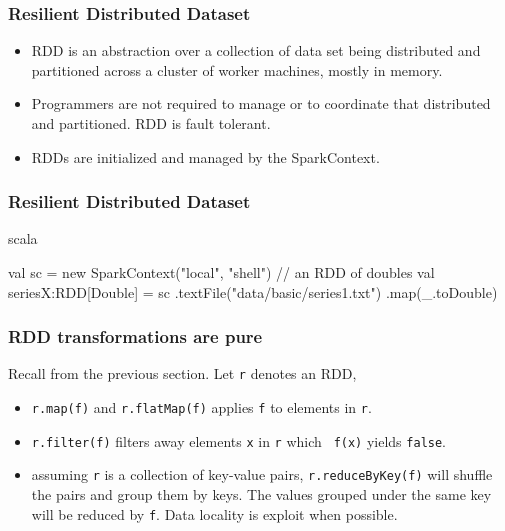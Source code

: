 \documentclass{beamer}
\newcommand{\beb}{\begin{exampleblock}}
\newcommand{\eeb}{\end{exampleblock}}
\begin{document}
\begin{frame}[fragile]
\frametitle{Resilient Distributed Dataset}

\begin{itemize} 
\item RDD is an abstraction over a collection of data set being distributed
and partitioned across a cluster of worker machines, mostly in memory.
\item Programmers are not required to manage or to coordinate that
distributed and partitioned. RDD is fault tolerant.  
\item RDDs are initialized and managed by the SparkContext.
\end{itemize}
\end{frame}


\begin{frame}[fragile]
\frametitle{Resilient Distributed Dataset}

\beb{scala}
\begin{code}
val sc = new SparkContext("local", "shell")	
// an RDD of doubles 
val seriesX:RDD[Double] = sc
  .textFile("data/basic/series1.txt")
  .map(_.toDouble)
\end{code}
\eeb
\end{frame}



\begin{frame}[fragile]
\frametitle{RDD transformations are pure}

Recall from the previous section. Let {\tt r} denotes an RDD,
\begin{itemize}
\item {\tt r.map(f)} and {\tt r.flatMap(f)} applies {\tt f} to
  elements in {\tt r}.
\item {\tt r.filter(f)} filters away elements {\tt x} in {\tt r} which {\tt
    f(x)} yields {\tt false}.
\item assuming {\tt r} is a collection of key-value pairs, {\tt r.reduceByKey(f)} will
  shuffle the pairs and group them by keys. The values grouped under the same key will be
  reduced by {\tt f}. Data locality is exploit when possible.
\end{itemize}

\end{frame}
\end{document}
